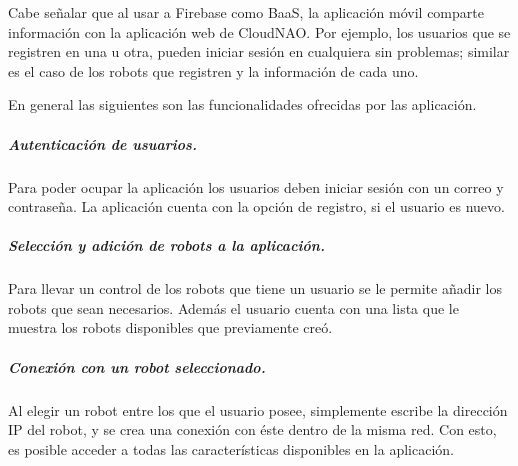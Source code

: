 Cabe señalar que al usar a Firebase como BaaS, la aplicación móvil
comparte información con la aplicación web de CloudNAO. Por ejemplo, los
usuarios que se registren en una u otra, pueden iniciar sesión en cualquiera
sin problemas; similar es el caso de los robots que registren y la información
de cada uno.

En general las siguientes son las funcionalidades ofrecidas por las aplicación.


\subparagraph{Autenticación de usuarios.}
\label{\detokenize{users_docs:autenticacion-de-usuarios}}
Para poder ocupar la aplicación los usuarios deben iniciar sesión con un correo
y contraseña. La aplicación cuenta con la opción de registro, si el usuario
es nuevo.


\begin{figure}[!h]
    \centering
    \qquad
    \qquad
\end{figure}

\subparagraph{Selección y adición de robots a la aplicación.}
\label{\detokenize{users_docs:los-usuarios-pueden-anadir-nuevos-robots}}
Para llevar un control de los robots que tiene un usuario se le permite añadir
los robots que sean necesarios.
Además el usuario cuenta con una lista que le muestra los robots disponibles
que previamente creó.

\begin{figure}[!h]
    \centering
    \qquad
    \qquad
\end{figure}



\subparagraph{Conexión con un robot seleccionado.}
\label{\detokenize{users_docs:conexion-con-un-robot-seleccionado}}
Al elegir un robot entre los que el usuario posee, simplemente escribe la
dirección IP del robot, y se crea una conexión con éste dentro de la misma
red. Con esto, es posible acceder a todas las características disponibles en la
aplicación.


\begin{figure}[!h]
    \centering
    \qquad

\end{figure}


